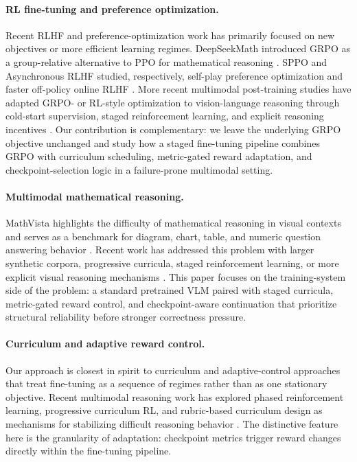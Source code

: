 \documentclass{article} %
\begin{document}
\paragraph{RL fine-tuning and preference optimization.}
Recent RLHF and preference-optimization work has primarily focused on new objectives or more efficient learning regimes. DeepSeekMath introduced GRPO as a group-relative alternative to PPO for mathematical reasoning \citep{deepseekmath2024}. SPPO and Asynchronous RLHF studied, respectively, self-play preference optimization and faster off-policy online RLHF \citep{wu2025sppo,noukhovitch2025async}. More recent multimodal post-training studies have adapted GRPO- or RL-style optimization to vision-language reasoning through cold-start supervision, staged reinforcement learning, and explicit reasoning incentives \citep{huang2025visionr1,wei2025coldstart,chen2025revisualr1}. Our contribution is complementary: we leave the underlying GRPO objective unchanged and study how a staged fine-tuning pipeline combines GRPO with curriculum scheduling, metric-gated reward adaptation, and checkpoint-selection logic in a failure-prone multimodal setting.

\paragraph{Multimodal mathematical reasoning.}
MathVista highlights the difficulty of mathematical reasoning in visual contexts and serves as a benchmark for diagram, chart, table, and numeric question answering behavior \citep{lu2024mathvista}. Recent work has addressed this problem with larger synthetic corpora, progressive curricula, staged reinforcement learning, or more explicit visual reasoning mechanisms \citep{zhang2025mavis,qi2025cogcom,liu2025infimmr,yuan2025vlcogito}. This paper focuses on the training-system side of the problem: a standard pretrained VLM paired with staged curricula, metric-gated reward control, and checkpoint-aware continuation that prioritize structural reliability before stronger correctness pressure.

\paragraph{Curriculum and adaptive reward control.}
Our approach is closest in spirit to curriculum and adaptive-control approaches that treat fine-tuning as a sequence of regimes rather than as one stationary objective. Recent multimodal reasoning work has explored phased reinforcement learning, progressive curriculum RL, and rubric-based curriculum design as mechanisms for stabilizing difficult reasoning behavior \citep{liu2025infimmr,yuan2025vlcogito,chen2026rucl}. The distinctive feature here is the granularity of adaptation: checkpoint metrics trigger reward changes directly within the fine-tuning pipeline.
\end{document}
